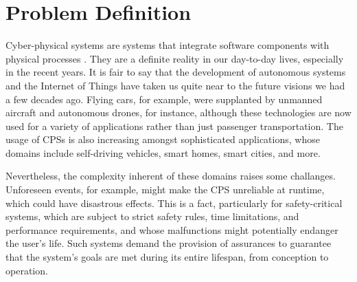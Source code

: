 


\section{Problem Definition}

Cyber-physical systems are systems that integrate software components with physical processes \cite{lee2008cyber}. They are a definite reality in our day-to-day lives, especially in the recent years. It is fair to say that the development of autonomous systems and the Internet of Things have taken us quite near to the future visions we had a few decades ago. Flying cars, for example, were supplanted by unmanned aircraft and autonomous drones, for instance, although these technologies are now used for a variety of applications rather than just passenger transportation. The usage of CPSs is also increasing amongst sophisticated applications, whose domains include self-driving vehicles, smart homes, smart cities, and more.

Nevertheless, the complexity inherent of these domains raises some challanges. Unforeseen events, for example, might make the CPS unreliable at runtime, which could have disastrous effects. This is a fact, particularly for safety-critical systems, which are subject to strict safety rules, time limitations, and performance requirements, and whose malfunctions might potentially endanger the user's life. Such systems demand the provision of assurances to guarantee that the system's goals are met during its entire lifespan, from conception to operation. 


